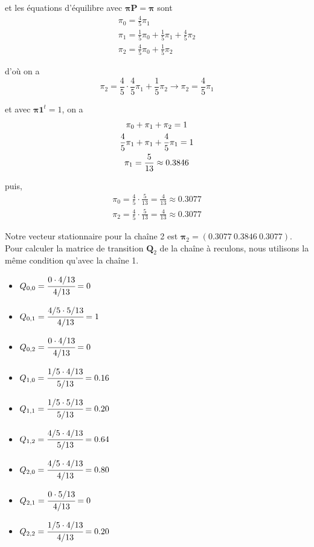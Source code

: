 \documentclass{article}
\begin{document}
et les équations d'équilibre avec $\boldsymbol{\pi}\boldsymbol{P}=\boldsymbol{\pi}$ sont
\begin{gather}
    \pi_0=\frac{4}{5}\pi_1 \\
    \pi_1=\frac{1}{5}\pi_0+\frac{1}{5}\pi_1+\frac{4}{5}\pi_2 \\
    \pi_2=\frac{4}{5}\pi_0+\frac{1}{5}\pi_2 
\end{gather}

d'où on a
\[
    \pi_2=\frac{4}{5}\cdot\frac{4}{5}\pi_1+\frac{1}{5}\pi_2\to\pi_2=\frac{4}{5}\pi_1
\]

et avec $\boldsymbol{\pi}\boldsymbol{1}^t=1$, on a
\begin{gather}
    \pi_0+\pi_1+\pi_2=1 \notag \\
    \frac{4}{5}\pi_1+\pi_1+\frac{4}{5}\pi_1=1 \notag \\
    \pi_1=\frac{5}{13}\approx0.3846
\end{gather}

puis,
\begin{gather}
    \pi_0=\frac{4}{5}\cdot\frac{5}{13}=\frac{4}{13}\approx0.3077 \\
    \pi_2=\frac{4}{5}\cdot\frac{5}{13}=\frac{4}{13}\approx0.3077
\end{gather}

Notre vecteur stationnaire pour la chaîne 2 est $\boldsymbol{\pi}_2=(0.3077\ 0.3846\ 0.3077)$. \\

Pour calculer la matrice de transition $\boldsymbol{Q}_2$ de la chaîne à 
reculons, nous utilisons la même condition qu'avec la chaîne 1.
\begin{itemize}[left=1cm]
    \item $Q_{0,0}=\cfrac{0\cdot4/13}{4/13}=0$
    \item $Q_{0,1}=\cfrac{4/5\cdot5/13}{4/13}=1$
    \item $Q_{0,2}=\cfrac{0\cdot4/13}{4/13}=0$
    \item $Q_{1,0}=\cfrac{1/5\cdot4/13}{5/13}=0.16$
    \item $Q_{1,1}=\cfrac{1/5\cdot5/13}{5/13}=0.20$
    \item $Q_{1,2}=\cfrac{4/5\cdot4/13}{5/13}=0.64$
    \item $Q_{2,0}=\cfrac{4/5\cdot4/13}{4/13}=0.80$
    \item $Q_{2,1}=\cfrac{0\cdot5/13}{4/13}=0$
    \item $Q_{2,2}=\cfrac{1/5\cdot4/13}{4/13}=0.20$
\end{itemize}
\end{document}
